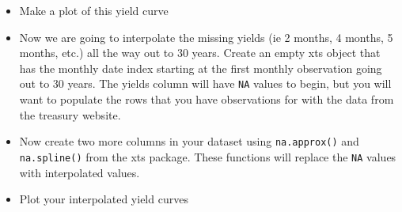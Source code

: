 \documentclass[12pt]{article}
\begin{document}
\begin{itemize}
\item Make a plot of this yield curve
\item Now we are going to interpolate the missing yields (ie 2 months, 4
months, 5 months, etc.) all the way out to 30 years. Create an empty
xts object that has the monthly date index starting at the first
monthly observation going out to 30 years. The yields column will
have \verb~NA~ values to begin, but you will want to populate the rows
that you have observations for with the data from the treasury
website.
\item Now create two more columns in your dataset using \verb~na.approx()~ and
\verb~na.spline()~ from the xts package. These functions will replace the
\verb~NA~ values with interpolated values.
\item Plot your interpolated yield curves
\end{itemize}
\end{document}
